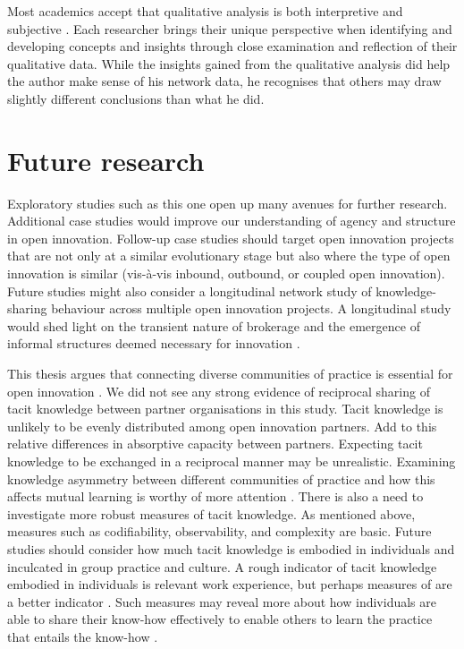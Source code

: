 Most academics accept that qualitative analysis is both interpretive and subjective \citep{aspers2019qualitative}. Each researcher brings their unique perspective when identifying and developing concepts and insights through close examination and reflection of their qualitative data. While the insights gained from the qualitative analysis did help the author make sense of his network data, he recognises that others may draw slightly different conclusions than what he did.

\section{Future research}

Exploratory studies such as this one open up many avenues for further research. Additional case studies would improve our understanding of agency and structure in open innovation. Follow-up case studies should target open innovation projects that are not only at a similar evolutionary stage but also where the type of open innovation is similar (vis-\`a-vis inbound, outbound, or coupled open innovation). Future studies might also consider a longitudinal network study of knowledge-sharing behaviour across multiple open innovation projects. A longitudinal study would shed light on the transient nature of brokerage and the emergence of informal structures deemed necessary for innovation \citep{quintane2021temporal}.  \medskip

This thesis argues that connecting diverse communities of practice is essential for open innovation \citep{brown2001knowledge}. We did not see any strong evidence of reciprocal sharing of tacit knowledge between partner organisations in this study. Tacit knowledge is unlikely to be evenly distributed among open innovation partners. Add to this relative differences in absorptive capacity between partners. Expecting tacit knowledge to be exchanged in a reciprocal manner may be unrealistic. Examining knowledge asymmetry between different communities of practice and how this affects mutual learning is worthy of more attention \citep{liu2021more}. There is also a need to investigate more robust measures of tacit knowledge. As mentioned above, measures such as codifiability, observability, and complexity are basic. Future studies should consider how much tacit knowledge is embodied in individuals and inculcated in group practice and culture. A rough indicator of tacit knowledge embodied in individuals is relevant work experience, but perhaps measures of  are a better indicator \citep{hedlund2002tacit}. Such measures may reveal more about how individuals are able to share their know-how effectively to enable others to learn the practice that entails the know-how \citep{van1986central, cook1999bridging}. \medskip 

